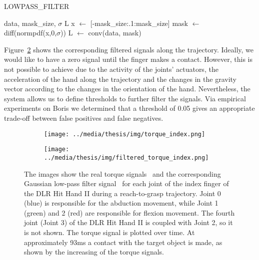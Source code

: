 \begin{algorithm} [t!]                   
\caption{LOWPASS\_FILTER}          
\label{alg:lowpass_filter}                           
\begin{algorithmic}                    
\REQUIRE data, mask\_size, $\sigma$
\ENSURE L
\STATE x $\gets$ [-mask\_size:.1:mask\_size]
\STATE mask $\gets$ diff(normpdf(x,0,$\sigma$))
\STATE L $\gets$ conv(data, mask)
\end{algorithmic}
\end{algorithm}

Figure~\ref{fig:07:filtered_torques} shows the corresponding filtered signals along the trajectory. Ideally, we would like to have a zero signal until the finger makes a contact. However, this is not possible to achieve due to the activity of the joints' actuators, the acceleration of the hand along the trajectory and the changes in the gravity vector according to the changes in the orientation of the hand. Nevertheless, the system allows us to define thresholds to further filter the signals. Via empirical experiments on Boris we determined that a threshold of 0.05 gives an appropriate trade-off between false positives and false negatives.

\begin{figure}[!t]
\centering
 \begin{subfigure}[t]{0.98\textwidth}
       \texttt{[image: ../media/thesis/img/torque\_index.png]}
       \caption{}\label{fig:07:torques}
  \end{subfigure} 
 \vspace{2mm}
  \begin{subfigure}[t]{0.98\textwidth}
     \texttt{[image: ../media/thesis/img/filtered\_torque\_index.png]}
     \caption{}\label{fig:07:filtered_torques}
  \end{subfigure}
\caption[Filtered torque signals]{The images show the real torque signals~ and the corresponding Gaussian low-pass filter signal~ for each joint of the index finger of the DLR Hit Hand II during a reach-to-grasp trajectory. Joint 0 (blue) is responsible for the abduction movement, while Joint 1 (green) and 2 (red) are responsible for flexion movement. The fourth joint (Joint 3) of the DLR Hit Hand II is coupled with Joint 2, so it is not shown. The torque signal is plotted over time. At approximately 93ms a contact with the target object is made, as shown by the increasing of the torque signals.}
\label{fig:07:torque_signal}
\end{figure}

